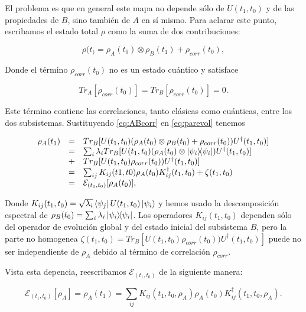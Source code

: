 El problema es que en general este mapa no depende sólo de $U(t_1, t_0)$ y de las propiedades de $B$, sino también de $A$ en sí mismo. Para aclarar este punto, escribamos el estado total $\rho$ como la suma de dos contribuciones:

\begin{equation}
    \rho(t_) = \rho_A(t_0) \otimes \rho_B(t_1) + \rho_{corr}(t_0) ,
    \label{eq:ABcorr}
\end{equation}

Donde el término $\rho_{corr}(t_0)$ no es un estado cuántico y satisface

\begin{equation}
    Tr_A[\rho_{corr}(t_0)] = Tr_B[\rho_{corr}(t_0)] = 0 .
\end{equation}

Este término contiene las correlaciones, tanto clásicas como cuánticas, entre los dos subsistemas. Sustituyendo  \ref{eq:ABcorr} en \ref{eq:parevol} tenemos

\begin{equation}
    \begin{array}{r c l}
        \rho_A(t_1)
        &=& Tr_B[U(t_1, t_0) (\rho_A(t_0) \otimes \rho_B(t_0) + \rho_{corr}(t_0)) U^\dagger(t_1, t_0)] \\
        &=& \sum_i \lambda_i Tr_B[U(t_1, t_0) (\rho_A(t_0) \otimes \ketbra{\psi_i}) U^\dagger(t_1, t_0)] \\ &+& Tr_B[U(t_1, t_0) \rho_{corr}(t_0)) U^\dagger(t_1, t_0)] \\
        &=& \sum_{ij} K_{ij}(t1, t0) \rho_A(t_0) K_{ij}^\dagger(t_1, t_0) + \zeta(t_1, t_0) \\
        &=& \mathcal{E}_{(t_1, t_0)}[\rho_A(t_0)] ,
    \end{array}
\end{equation}

Donde $K_{ij}(t_1, t_0) = \sqrt{\lambda_i} \bra{\psi_j} U(t_1, t_0) \ket{\psi_i}$ y hemos usado la descomposición espectral de $\rho_B(t_0) = \sum_i \lambda_i \ketbra{\psi_i}$. Los operadores $K_{ij}(t_1, t_0)$ dependen sólo del operador de evolución global y del estado inicial del subsistema $B$, pero la parte no homogenea $\zeta(t_1, t_0) = Tr_B[U(t_1, t_0) \rho_{corr}(t_0)) U^\dagger(t_1, t_0)]$ puede no ser independiente de $\rho_A$ debido al término de correlación $\rho_{corr}$.

Vista esta depencia, reescribamos $\mathcal{E}_{(t_1, t_0)}$ de la siguiente manera:

\begin{equation}
    \mathcal{E}_{(t_1, t_0)}[\rho_A] = \rho_A(t_1) = \sum_{ij} K_{ij}(t_1, t_0, \rho_A) \rho_A(t_0) K^\dagger_{ij}(t_1, t_0, \rho_A) .
\end{equation}

